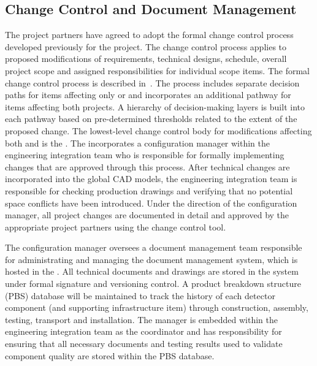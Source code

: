 \subsection{Change Control and Document Management}
\label{sec:dune_changecontrol}

The  project partners have agreed to adopt 
the formal change control process developed previously for the 
 project.  The change control process applies to 
proposed modifications of requirements, technical designs, 
schedule, overall project scope and assigned responsibilities 
for individual scope items.  The formal  
change control process is described in~.  The 
process includes separate decision paths for items affecting 
only  or  and incorporates an additional 
pathway for items affecting both projects.  A hierarchy of 
decision-making layers is built into each pathway based on 
pre-determined thresholds related to the extent of the proposed 
change.  The lowest-level change control body for modifications 
affecting both  and  is the .  
The  incorporates a configuration manager within the 
engineering integration team who is responsible for formally 
implementing changes that are approved through this process.  
After technical changes are incorporated into the global \threed 
CAD models, the engineering integration team is responsible for 
checking production drawings and verifying that no potential 
space conflicts have been introduced.  Under the direction of 
the configuration manager, all project changes are documented 
in detail and approved by the appropriate project partners using 
the  change control tool.

The configuration manager oversees a document management team
responsible for administrating and managing the 
document management system, which is hosted in the .  All
technical documents and drawings are stored in the  system
under formal signature and versioning control.  A product breakdown
structure (PBS) database will be maintained to track the history of
each detector component (and supporting infrastructure item) through
construction, assembly, testing, transport and installation.  The
  manager is embedded within the
 engineering integration team as the  coordinator
and has responsibility for ensuring that all necessary documents and
testing results used to validate component quality are stored within
the PBS database.

